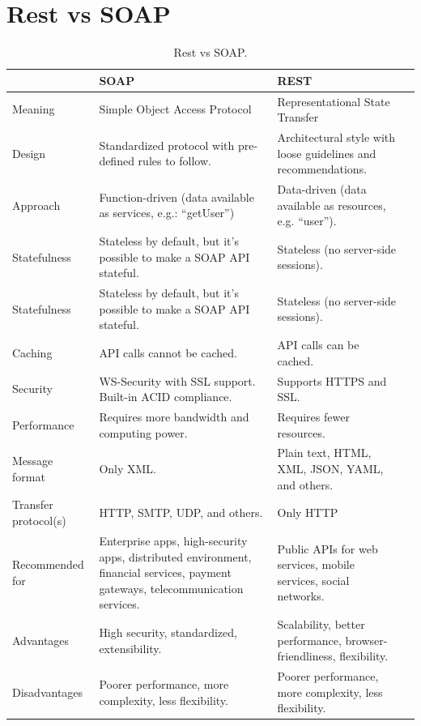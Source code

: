 \documentclass{report}
\begin{document}
	\section{Rest vs SOAP}
	\begin{table}[h]
		\begin{center}
			\caption{Rest vs SOAP.}
			\label{tab:Rest vs SOAP}
			\begin{tabular}{|p{3cm}|p{5cm}|p{5cm}|p{5cm}|} %
				\hline
				\textbf{} & \textbf{SOAP} & \textbf{REST}\\
				\hline
				Meaning & Simple Object Access Protocol & 
				
				Representational State Transfer\\
				\hline
				Design & Standardized protocol with pre-defined rules to follow. & Architectural style with loose guidelines and recommendations.\\
				\hline
				Approach & Function-driven (data available as services, e.g.: “getUser”) & Data-driven (data available as resources, e.g. “user”).\\
				\hline
				Statefulness&Stateless by default, but it’s possible to make a SOAP API stateful.&Stateless (no server-side sessions).\\
				Statefulness&Stateless by default, but it’s possible to make a SOAP API stateful.&Stateless (no server-side sessions).\\
				\hline
				Caching&API calls cannot be cached.&API calls can be cached.\\
				\hline
				Security&WS-Security with SSL support. Built-in ACID compliance.&Supports HTTPS and SSL.\\
				\hline
				Performance&Requires more bandwidth and computing power.&Requires fewer resources.\\
				\hline
				Message format&Only XML.&Plain text, HTML, XML, JSON, YAML, and others.\\
				\hline
				Transfer protocol(s)&HTTP, SMTP, UDP, and others.&Only
				HTTP\\
				\hline
				Recommended for&Enterprise apps, high-security apps, distributed environment, financial services, payment gateways, telecommunication services.&Public APIs for web services, mobile services, social networks.\\
				\hline
				Advantages&High security, standardized, extensibility.&Scalability, better performance, browser-friendliness, flexibility.\\
				\hline
				Disadvantages&Poorer performance, more complexity, less flexibility.&Poorer performance, more complexity, less flexibility.\\
				\hline
			\end{tabular}
		\end{center}
	\end{table}
	\newpage
\end{document}
